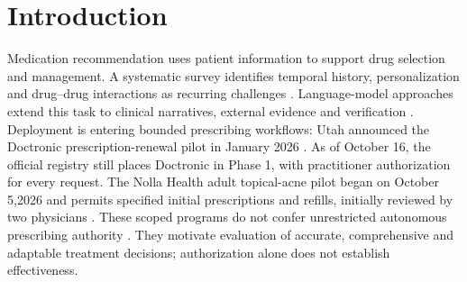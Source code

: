 \maketitle
\begin{abstract}
Can prescription agents learn conditional executable skills from case feedback and reduce omissions, extras and joint-order errors on new patients? We study this question with RxRSIAgent, task-specific workflows combining evidence tools, frozen language models and external program memory. Public-question results and local MIMIC-IV experiments do not establish superiority to the strongest controls. A new eICU audit evaluates256 previously unused patients with two local backbones and three six-round feedback orders. The learner retains5,4,4 drug-specific conditional programs, all deletions and none with retained empirical exceptions. In the first prespecified stream, Qwen drug F1 changes from 6.61\% to 6.65\%, and Llama from 4.58\% to 4.64\%. Expanding supported joint templates from2 to125 produces additional development candidates but no retained field repair. We separate missing drugs, extra drugs and complete-tuple discrepancies, include feedback-memory controls, and preserve uncertain clinical facts in source-based preflight tools. The experiments identify limits of sparse order-event feedback and conditional transfer, while leaving sustained, clinically appropriate prescription self-improvement unproved.
\end{abstract}

\section{Introduction}
Medication recommendation uses patient information to support drug selection and management. A systematic survey identifies temporal history, personalization and drug--drug interactions as recurring challenges \citep{mrsurvey}. Language-model approaches extend this task to clinical narratives, external evidence and verification \citep{lamrec,saferx}. Deployment is entering bounded prescribing workflows: Utah announced the Doctronic prescription-renewal pilot in January 2026 \citep{utahrenewal}. As of October 16, the official registry still places Doctronic in Phase 1, with practitioner authorization for every request. The Nolla Health adult topical-acne pilot began on October 5,2026 and permits specified initial prescriptions and refills, initially reviewed by two physicians \citep{utahpilots}. These scoped programs do not confer unrestricted autonomous prescribing authority \citep{utahfaq}. They motivate evaluation of accurate, comprehensive and adaptable treatment decisions; authorization alone does not establish effectiveness.

